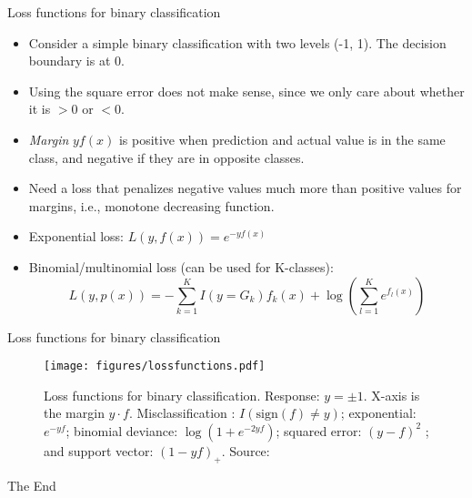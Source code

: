 \documentclass[aspectratio=169]{beamer}
\begin{document}
\begin{frame}{Loss functions for binary classification}
    \begin{itemize}
        \item Consider a simple binary classification with two levels (-1, 1). The decision boundary is at 0.
        \item Using the square error does not make sense, since we only care about whether it is $>0$ or $<0$.
        \item \textit{Margin} $yf(x)$ is positive when prediction and actual value is in the same class, and negative if they are in opposite classes.
        \item Need a loss that penalizes negative values much more than positive values for margins, i.e., monotone decreasing function.
        \item Exponential loss: $L(y, f(x)) = e^{-yf(x)}$
        \item Binomial/multinomial loss (can be used for K-classes):
        \begin{equation*}
            L(y, p(x)) = -\sum_{k=1}^K I(y=G_k)f_k(x) + \log \left(\sum_{l=1}^K e^{f_l(x)}\right)
        \end{equation*}
    \end{itemize}
\end{frame}


\begin{frame}{Loss functions for binary classification}
\begin{figure}
    \centering
    \texttt{[image: figures/lossfunctions.pdf]}
    \caption{Loss functions for binary classification. Response: $y = \pm1$. X-axis is the margin $y \cdot f$. Misclassification : $I(\mathrm{sign}(f) \neq y)$; exponential: $e^{-yf}$; binomial deviance: $\log(1 + e^{-2yf})$; squared error: $(y - f)^2$ ; and support vector: $(1 - yf)_+$. Source: \cite{hastieElementsStatisticalLearning2016}}
\end{figure}
\end{frame}


\begin{frame}
    \Huge{\centerline{The End}}
\end{frame}
\end{document}
